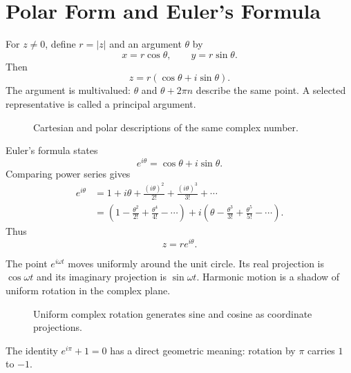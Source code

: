 \section{Polar Form and Euler's Formula}
\label{sec:ch5-polar-euler}

For $z\neq0$, define $r=|z|$ and an argument $\theta$ by
\[
x=r\cos\theta,\qquad y=r\sin\theta.
\]
Then
\[
z=r(\cos\theta+i\sin\theta).
\]
The argument is multivalued: $\theta$ and $\theta+2\pi n$ describe the same point. A selected representative is called a principal argument.

\begin{figure}[htbp]
\centering

\caption{Cartesian and polar descriptions of the same complex number.}
\label{fig:ch5-polar}
\end{figure}

Euler's formula states
\[
\boxed{e^{i\theta}=\cos\theta+i\sin\theta}.
\]
Comparing power series gives
\begin{align}
e^{i\theta}
&=1+i\theta+\frac{(i\theta)^2}{2!}+\frac{(i\theta)^3}{3!}+\cdots\\
&=\left(1-\frac{\theta^2}{2!}+\frac{\theta^4}{4!}-\cdots\right)
+i\left(\theta-\frac{\theta^3}{3!}+\frac{\theta^5}{5!}-\cdots\right).
\end{align}
Thus
\[
\boxed{z=re^{i\theta}}.
\]

\begin{keyidea}
The point $e^{i\omega t}$ moves uniformly around the unit circle. Its real projection is $\cos\omega t$ and its imaginary projection is $\sin\omega t$. Harmonic motion is a shadow of uniform rotation in the complex plane.
\end{keyidea}

\begin{figure}[htbp]
\centering

\caption{Uniform complex rotation generates sine and cosine as coordinate projections.}
\label{fig:ch5-euler-rotation}
\end{figure}

The identity $e^{i\pi}+1=0$ has a direct geometric meaning: rotation by $\pi$ carries $1$ to $-1$.
